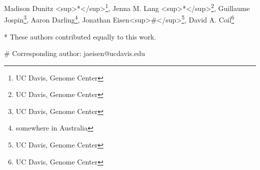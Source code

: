 Madison Dunitz <sup>*</sup>\footnote{UC Davis, Genome Center}, Jenna M. Lang <sup>*</sup>\footnote{UC Davis, Genome Center}, Guillaume Jospin\footnote{UC Davis, Genome Center}, Aaron Darling\footnote{somewhere in Australia}, Jonathan Eisen<sup>#</sup>\footnote{UC Davis, Genome Center}, David A. Coil\footnote{UC Davis, Genome Center} 

* These authors contributed equally to this work.

\# Corresponding author: jaeisen@ucdavis.edu
